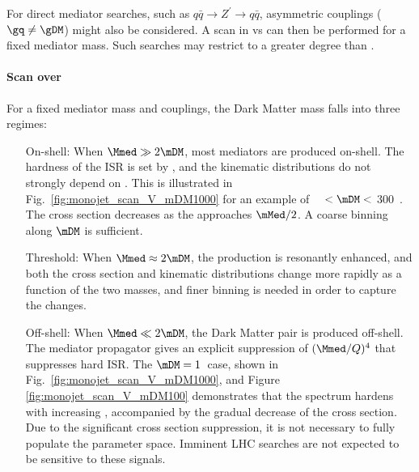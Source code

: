 For direct mediator searches, such as $q\bar q\to Z^\prime \to q\bar q$, asymmetric couplings ($\gq \ne \gDM$)
might also be considered. A scan in \gDM vs \gq can then be performed for a fixed mediator mass. Such searches
may restrict \gq to a greater degree than
\gDM.

\paragraph{Scan over \mDM}

For a fixed mediator mass \mMed and couplings, the Dark Matter mass falls into three regimes:
\begin{itemize}
\item[On-shell:] When $\Mmed \gg 2 \mDM$, most mediators are produced on-shell. The hardness of the ISR is set by \Mmed, and the kinematic distributions do not strongly depend on \mDM. This is illustrated in Fig.~\ref{fig:monojet_scan_V_mDM1000} for an example of ~~\gev $<\mDM<$ 300~\gev. The cross section decreases as the \mDM approaches $\mMed/2$. A coarse binning along $\mDM$ is sufficient.
\item[Threshold:] When $\Mmed \approx 2\mDM$, the production is resonantly enhanced, and both the cross section and kinematic distributions change more rapidly as a function of the two masses, and finer binning is needed in order to capture the changes.
\item[Off-shell:] When $\Mmed \ll 2 \mDM$, the Dark Matter pair is produced off-shell. The mediator propagator gives an explicit suppression of $(\Mmed/Q)^4$ that suppresses hard ISR. The $\mDM=1$~\tev case, shown in Fig.~\ref{fig:monojet_scan_V_mDM1000}, and Figure\,\ref{fig:monojet_scan_V_mDM100} demonstrates that the \MET spectrum hardens with increasing \mDM, accompanied by the gradual decrease of the cross section. Due to the significant cross section suppression, it is not necessary to fully populate the parameter space. Imminent LHC searches are not expected to be sensitive to these signals.
\end{itemize}

